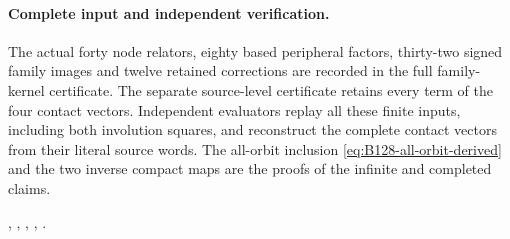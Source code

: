 \paragraph{Complete input and independent verification.}
The actual forty node relators, eighty based peripheral factors,
thirty-two signed family images and twelve retained corrections
are recorded in the full family-kernel certificate. The separate
source-level certificate retains every term of the four contact
vectors. Independent evaluators replay all these finite inputs,
including both involution squares, and reconstruct the complete
contact vectors from their literal source words. The all-orbit
inclusion \eqref{eq:B128-all-orbit-derived} and the two inverse
compact maps are the proofs of the infinite and completed claims.
\begingroup\raggedright
{},
,
,
,
.
\par\endgroup
